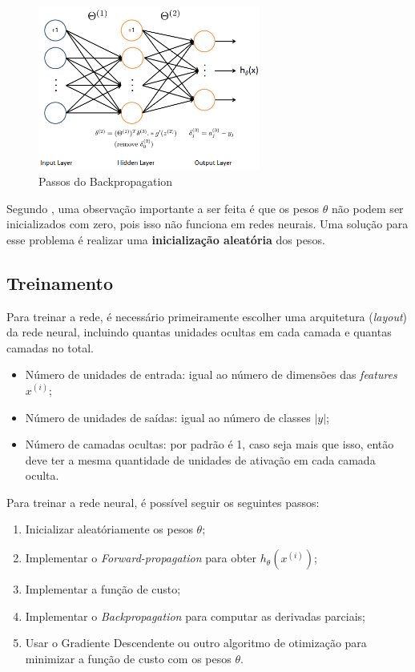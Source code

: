 \begin{figure}
\centering
\caption{Passos do Backpropagation} \label{fig:backpropagationalgex}
\includegraphics[width=0.65\textwidth]{img/backpropagationalg}
\end{figure}

Segundo \cite{machinelearningcoursera}, uma observação importante a ser feita é que os pesos $\theta$ não podem ser inicializados com zero, pois isso não funciona em redes neurais. Uma solução para esse problema é realizar uma \textbf{inicialização aleatória} dos pesos.

\subsection{Treinamento}

Para treinar a rede, é necessário primeiramente escolher uma arquitetura (\textit{layout}) da rede neural, incluindo quantas unidades ocultas em cada camada e quantas camadas no total.

\begin{itemize}
	\item Número de unidades de entrada: igual ao número de dimensões das \textit{features} $x^{(i)}$;
	\item Número de unidades de saídas: igual ao número de classes $|y|$;
	\item Número de camadas ocultas: por padrão é 1, caso seja mais que isso, então deve ter a mesma quantidade de unidades de ativação em cada camada oculta.
\end{itemize}

Para treinar a rede neural, é possível seguir os seguintes passos:

\begin{enumerate}

\item Inicializar aleatóriamente os pesos $\theta$;
\item Implementar o \textit{Forward-propagation} para obter $h_\theta(x^{(i)})$;
\item Implementar a função de custo;
\item Implementar o \textit{Backpropagation} para computar as derivadas parciais;
\item Usar o Gradiente Descendente ou outro algoritmo de otimização para minimizar a função de custo com os pesos $\theta$.

\end{enumerate}


